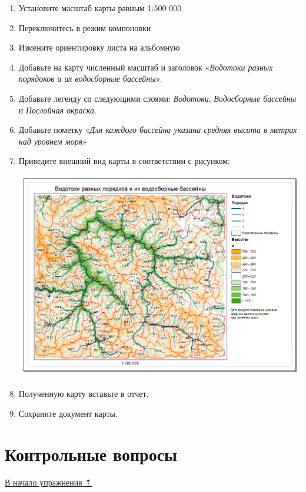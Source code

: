 \documentclass[]{book}
\theoremstyle{definition}
\theoremstyle{definition}
\theoremstyle{definition}
\theoremstyle{remark}
\begin{document}
\begin{enumerate}
\def\labelenumi{\arabic{enumi}.}
\item
  Установите масштаб карты равным 1:500 000
\item
  Переключитесь в режим компоновки
\item
  Измените ориентировку листа на альбомную
\item
  Добавьте на карту численный масштаб и заголовок «\emph{Водотоки разных
  порядоков и их водосборные бассейны}».
\item
  Добавьте легенду со следующими слоями: \emph{Водотоки},
  \emph{Водосборные бассейны} и \emph{Послойная окраска}.
\item
  Добавьте пометку «\emph{Для каждого бассейна указана средняя высота в
  метрах над уровнем моря}»
\item
  Приведите внешний вид карты в соответствии с рисунком:

  \includegraphics{images/Ex15/image32.png}
\item
  Полученную карту вставьте в отчет.
\item
  Сохраните документ карты.
\end{enumerate}

\hypertarget{dem-questions}{%
\section{Контрольные вопросы}\label{dem-questions}}

\protect\hyperlink{dem}{В начало упражнения ⇡}
\end{document}
